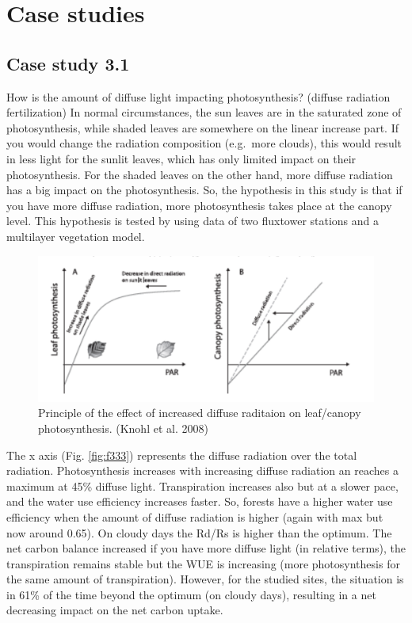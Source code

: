 \documentclass[12pt,oneside]{book}
\begin{document}
\section{Case studies}\label{case-studies-1}

\subsection{Case study 3.1}\label{case-study-3.1}

How is the amount of diffuse light impacting photosynthesis? (diffuse
radiation fertilization) In normal circumstances, the sun leaves are in
the saturated zone of photosynthesis, while shaded leaves are somewhere
on the linear increase part. If you would change the radiation
composition (e.g.~more clouds), this would result in less light for the
sunlit leaves, which has only limited impact on their photosynthesis.
For the shaded leaves on the other hand, more diffuse radiation has a
big impact on the photosynthesis. So, the hypothesis in this study is
that if you have more diffuse radiation, more photosynthesis takes place
at the canopy level. This hypothesis is tested by using data of two
fluxtower stations and a multilayer vegetation model.

\begin{figure}

{\centering \includegraphics[width=0.8\linewidth]{figures/chap3/f332_knohl1} 

}

\caption{Principle of the effect of increased diffuse raditaion on leaf/canopy photosynthesis. (Knohl et al. 2008)}\label{fig:f332}
\end{figure}

The x axis (Fig. \ref{fig:f333}) represents the diffuse radiation over
the total radiation. Photosynthesis increases with increasing diffuse
radiation an reaches a maximum at 45\% diffuse light. Transpiration
increases also but at a slower pace, and the water use efficiency
increases faster. So, forests have a higher water use efficiency when
the amount of diffuse radiation is higher (again with max but now around
0.65). On cloudy days the Rd/Rs is higher than the optimum. The net
carbon balance increased if you have more diffuse light (in relative
terms), the transpiration remains stable but the WUE is increasing (more
photosynthesis for the same amount of transpiration). However, for the
studied sites, the situation is in 61\% of the time beyond the optimum
(on cloudy days), resulting in a net decreasing impact on the net carbon
uptake.
\end{document}
